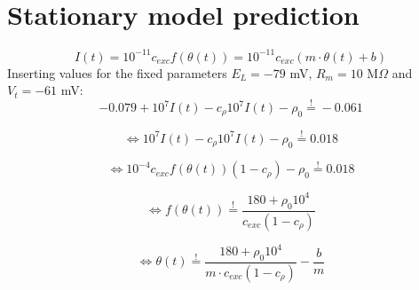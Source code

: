 \documentclass[a4paper,10pt,hidelinks]{scrreprt}
\begin{document}
	\section{Stationary model prediction}
	\begin{equation}
	I(t) = 10^{-11} c_{exc} f(\theta(t)) = 10^{-11} c_{exc} (m \cdot \theta(t) 
	+ b)
	\end{equation}
	Inserting values for the fixed parameters $E_{L}=-79$ mV, $R_{m}=10$ 
	M$\Omega$ 
	and $V_{t}=-61$ mV:
	\begin{equation}
	-0.079 + 10^{7} I(t) - c_{\rho} 10^{7} I(t) - \rho_{0} \overset{!}{=} -0.061
	\end{equation}
	
	\begin{equation}
	\Leftrightarrow 10^{7} I(t) - c_{\rho} 10^{7} I(t) - \rho_{0} 
	\overset{!}{=} 0.018
	\end{equation}
	
	\begin{equation}
	\Leftrightarrow 10^{-4} c_{exc} f(\theta(t)) (1 - c_{\rho}) - \rho_{0} 
	\overset{!}{=} 0.018
	\end{equation}
	
	\begin{equation}
	\Leftrightarrow f(\theta(t)) \overset{!}{=} \frac{180 + \rho_{0}10^{4}} 
	{c_{exc}(1 - c_{\rho})}
	\end{equation}
	
	\begin{equation}
	\Leftrightarrow \theta(t) \overset{!}{=} \frac{180 + \rho_{0}10^{4}} 
	{m \cdot c_{exc}(1 - c_{\rho})} - \frac{b}{m}
	\end{equation}
\end{document}
